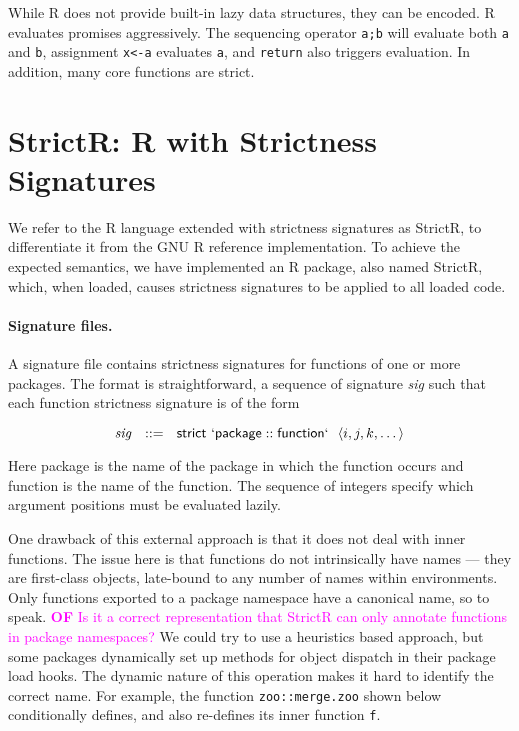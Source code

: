 \documentclass[review,nonacm,screen,acmsmall,anonymous=true]{acmart}
\newcommand{\authorcomment}[3]{\xspace\textcolor{#1}{{\bf #2} #3}\xspace}
\newcommand{\OF}[1]{\authorcomment{magenta}{OF}{#1}}
\newcommand{\code}[1]{\lstinline |#1|\xspace}
\newcommand{\strictr}{{\sf StrictR}\xspace}
\begin{document}
\noindent
While R does not provide built-in lazy data structures, they can be encoded. R
evaluates promises aggressively. The sequencing operator \code{a;b} will
evaluate both \code a and \code b, assignment \code{x<-a} evaluates \code a, and
\code{return} also triggers evaluation. In addition, many core functions are
strict.


\section{StrictR: R with Strictness Signatures}

We refer to the R language extended with strictness signatures as \strictr, to
differentiate it from the GNU R reference implementation. To achieve the
expected semantics, we have implemented an R package, also named \strictr,
which, when loaded, causes strictness signatures to be applied to all loaded
code.

\paragraph{Signature files.}
A signature file contains strictness signatures for functions of one or more
packages. The format is straightforward, a sequence of signature \emph{sig}
such that each function strictness signature is of the form

\[
\mathit{sig}~~::=~~\mathsf{strict}~\mathsf{`package}::\mathsf{function`}~~\langle i, j, k, \dots\rangle
\]

Here {\sf package} is the name of the package in which the function occurs and
{\sf function} is the name of the function. The sequence of integers specify
which argument positions must be evaluated lazily.

One drawback of this external approach is that it does not deal with inner
functions. The issue here is that functions do not intrinsically have names ---
they are first-class objects, late-bound to any number of names within environments.
Only functions exported to a package namespace have a canonical name, so to
speak. \OF{Is it a correct representation that StrictR can only annotate
functions in package namespaces?}
We could try to use a heuristics based approach, but some packages dynamically set up
methods for object dispatch in their package load hooks. The dynamic nature of
this operation makes it hard to identify the correct name.
For example, the function \code{zoo::merge.zoo} shown below
conditionally defines, and also re-defines its inner function \code{f}.
\end{document}
